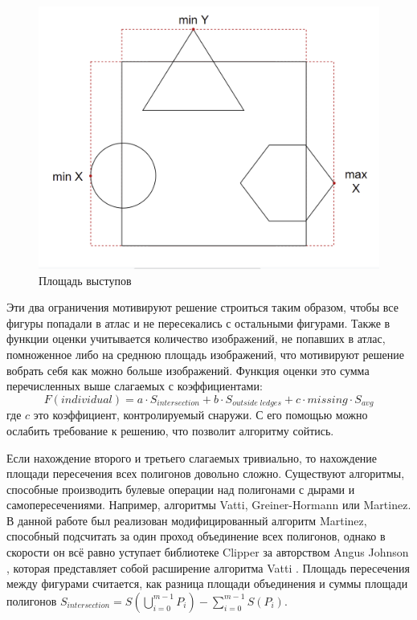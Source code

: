 \documentclass{fefu_thesis/cls/fefu}
\begin{document}
    \begin{figure}[H]
        \centering
        \includegraphics[scale=0.5]{images/ledges.png}
        \caption{Площадь выступов}
    \end{figure}

    Эти два ограничения мотивируют решение строиться таким образом, чтобы все фигуры попадали в атлас и не пересекались с остальными фигурами. Также в функции оценки учитывается количество изображений, не попавших в атлас, помноженное либо на среднюю площадь изображений, что мотивируют решение вобрать себя как можно больше изображений. Функция оценки это сумма перечисленных выше слагаемых с коэффициентами:
    \[
        F\left(individual\right) = a \cdot S_{intersection} + b \cdot S_{outside\;ledges} + c \cdot missing \cdot S_{avg}
    \]
    где $c$ это коэффициент, контролируемый снаружи. С его помощью можно ослабить требование к решению, что позволит алгоритму сойтись.

    Если нахождение второго и третьего слагаемых тривиально, то нахождение площади пересечения всех полигонов довольно сложно. Существуют алгоритмы, способные производить булевые операции над полигонами с дырами и самопересечениями. Например, алгоритмы Vatti\cite{Vatti}, Greiner-Hormann\cite{GreinerHormann} или Martinez\cite{Martinez}. В данной работе был реализован модифицированный алгоритм Martinez\cite{Martinez}, способный подсчитать за один проход объединение всех полигонов, однако в скорости он всё равно уступает библиотеке Clipper за авторством Angus Johnson \cite{Clipper}, которая представляет собой расширение алгоритма Vatti \cite{Vatti}. Площадь пересечения между фигурами считается, как разница площади объединения и суммы площади полигонов $S_{intersection} = S\left(\bigcup\limits_{i = 0}^{m - 1} P_i\right) - \sum\limits_{i = 0}^{m - 1}S\left(P_i\right)$.
\end{document}
